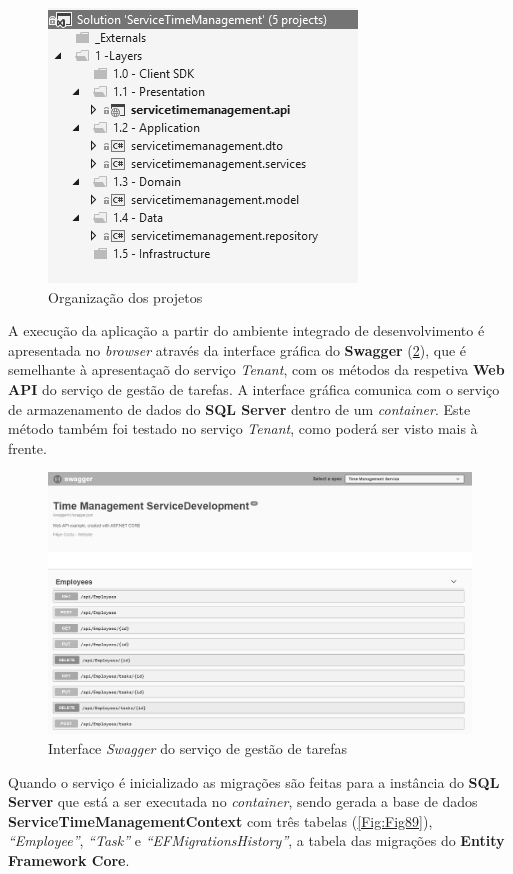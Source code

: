 \begin{figure}[hbt!]
\centering
\includegraphics[width=0.4\linewidth]{Cap7/TimeManagementCSPROJ.png}
\caption{Organização dos projetos}
\label{Fig:Fig87}
\end{figure}

\hspace{1cm}A execução da aplicação a partir do ambiente integrado de desenvolvimento é apresentada no \textit{browser} através da interface gráfica do \textbf{Swagger} (\ref{Fig:Fig88}), que é semelhante à apresentaçaõ do serviço \textit{Tenant}, com os métodos da respetiva \textbf{Web API} do serviço de gestão de tarefas. A interface gráfica comunica com o serviço de armazenamento de dados do \textbf{SQL Server} dentro de um \textit{container}. Este método também foi testado no serviço \textit{Tenant}, como poderá ser visto mais à frente. 

\begin{figure}[hbt!]
\centering
\includegraphics[width=0.8\linewidth]{Cap7/TimeManagementDevelopment.png}
\caption{Interface \textit{Swagger} do serviço de gestão de tarefas}
\label{Fig:Fig88}
\end{figure}

Quando o serviço é inicializado as migrações são feitas para a instância do \textbf{SQL Server} que está a ser executada no \textit{container}, sendo gerada a base de dados \textbf{ServiceTimeManagementContext} com três tabelas (\ref{Fig:Fig89}), \textit{``Employee''}, \textit{``Task''} e \textit{``EFMigrationsHistory''}, a tabela das migrações do \textbf{Entity Framework Core}.


